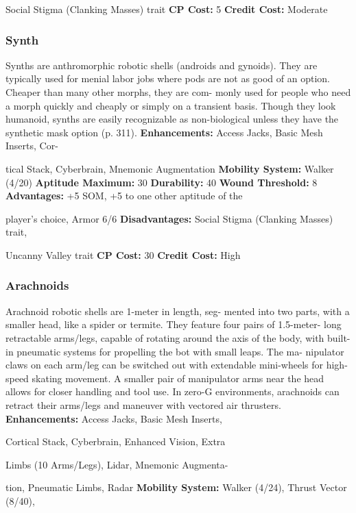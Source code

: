 Social Stigma (Clanking Masses) trait
\textbf{CP Cost:} 5
\textbf{Credit Cost: }Moderate

\subsubsection{Synth}

Synths are anthromorphic robotic shells (androids 
and gynoids). They are typically used for menial 
labor jobs where pods are not as good of an option. 
Cheaper than many other morphs, they are com-
monly used for people who need a morph quickly 
and cheaply or simply on a transient basis. Though 
they look humanoid, synths are easily recognizable 
as non-biological unless they have the synthetic mask 
option (p. 311).
\textbf{Enhancements:} Access Jacks, Basic Mesh Inserts, Cor-

tical Stack, Cyberbrain, Mnemonic Augmentation
\textbf{Mobility System:} Walker (4/20)
\textbf{Aptitude Maximum: }30
\textbf{Durability:} 40
\textbf{Wound Threshold:} 8
\textbf{Advantages: }+5 SOM, +5 to one other aptitude of the 

player's choice, Armor 6/6
\textbf{Disadvantages: }Social Stigma (Clanking Masses) trait, 

Uncanny Valley trait
\textbf{CP Cost:} 30
\textbf{Credit Cost: }High

\subsubsection{Arachnoids}

Arachnoid robotic shells are 1-meter in length, seg-
mented into two parts, with a smaller head, like a 
spider or termite. They feature four pairs of 1.5-meter-
long retractable arms/legs, capable of rotating around 
the axis of the body, with built-in pneumatic systems 
for propelling the bot with small leaps. The ma-
nipulator claws on each arm/leg can be switched out 
with extendable mini-wheels for high-speed skating 
movement. A smaller pair of manipulator arms near 
the head allows for closer handling and tool use. In 
zero-G environments, arachnoids can retract their 
arms/legs and maneuver with vectored air thrusters.
\textbf{Enhancements:} Access Jacks, Basic Mesh Inserts, 

Cortical Stack, Cyberbrain, Enhanced Vision, Extra 

Limbs (10 Arms/Legs), Lidar, Mnemonic Augmenta-

tion, Pneumatic Limbs, Radar
\textbf{Mobility System:} Walker (4/24), Thrust Vector (8/40), 


